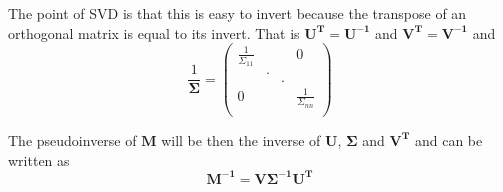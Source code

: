 The point of SVD is that this is easy to invert because the transpose of an orthogonal matrix is equal to its invert. That is   $\bm{U^T}=\bm{U^{-1}}$ and $\bm{V^T}=\bm{V^{-1}}$ and
\begin{equation}\label{eq:sigma_inv}
\frac{1}{\bm{\Sigma}} = \begin{pmatrix} 
\frac{1}{\Sigma_{11}} &  &  & 0 \\
  & . &  &  \\
  &   & . &  \\

0 &  &  & \frac{1}{\Sigma_{nn}} \\
 \end{pmatrix}
\end{equation}

The pseudoinverse of $\bm{M}$ will be then the inverse of $\bm{U}$, $\bm{\Sigma}$ and $\bm{V^T}$ and can be written as
\begin{equation}\label{eq:psMinv}
    \bm{M^{-1}} = \bm{V \Sigma^{-1} U^T}
\end{equation}







